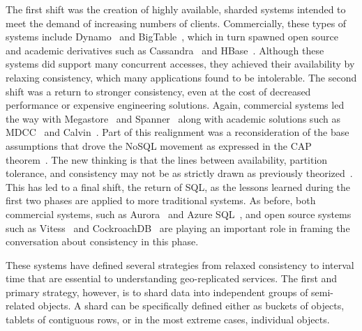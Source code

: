 The first shift was the creation of highly available, sharded systems intended to meet the demand of increasing numbers of clients.
Commercially, these types of systems include Dynamo~\cite{dynamo} and BigTable~\cite{bigtable}, which in turn spawned open source and academic derivatives such as Cassandra~\cite{cassandra} and HBase~\cite{hbase}.
Although these systems did support many concurrent accesses, they achieved their availability by relaxing consistency, which many applications found to be intolerable.
The second shift was a return to stronger consistency, even at the cost of decreased performance or expensive engineering solutions.
Again, commercial systems led the way with Megastore~\cite{megastore} and Spanner~\cite{spanner} along with academic solutions such as MDCC~\cite{mdcc} and Calvin~\cite{calvindb,calvinfs}.
Part of this realignment was a reconsideration of the base assumptions that drove the NoSQL movement as expressed in the CAP theorem~\cite{cap,pushing_cap}.
The new thinking is that the lines between availability, partition tolerance, and consistency may not be as strictly drawn as previously theorized~\cite{hat,consistency_tradeoffs,cap_rules_change}.
This has led to a final shift, the return of SQL, as the lessons learned during the first two phases are applied to more traditional systems.
As before, both commercial systems, such as Aurora~\cite{aurora} and Azure SQL~\cite{azure_sql_database}, and open source systems such as Vitess~\cite{vitess} and CockroachDB~\cite{cockroachdb} are playing an important role in framing the conversation about consistency in this phase.


These systems have defined several strategies from relaxed consistency to interval time that are essential to understanding geo-replicated services.
The first and primary strategy, however, is to shard data into independent groups of semi-related objects.
A shard can be specifically defined either as buckets of objects, tablets of contiguous rows, or in the most extreme cases, individual objects.

